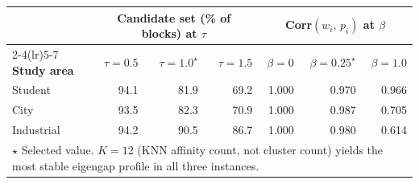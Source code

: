 \begin{tabular}{l rrr rrr}
\toprule
& \multicolumn{3}{c}{\textbf{Candidate set (\% of blocks) at } $\tau$}
& \multicolumn{3}{c}{\textbf{Corr$(w_i,\,p_i)$ at } $\beta$} \\
\cmidrule(lr){2-4}\cmidrule(lr){5-7}
\textbf{Study area}
  & $\tau=0.5$ & $\tau=1.0^{\star}$ & $\tau=1.5$
  & $\beta=0$  & $\beta=0.25^{\star}$ & $\beta=1.0$ \\
\midrule
Student    & 94.1 & 81.9 & 69.2 & 1.000 & 0.970 & 0.966 \\
City       & 93.5 & 82.3 & 70.9 & 1.000 & 0.987 & 0.705 \\
Industrial & 94.2 & 90.5 & 86.7 & 1.000 & 0.980 & 0.614 \\
\bottomrule
\multicolumn{7}{l}{\footnotesize $\star$ Selected value. $K=12$ (KNN affinity count, not cluster count) yields the most stable eigengap profile in all three instances.}
\end{tabular}

